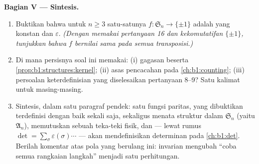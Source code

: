 \begin{problem}
\medskip
\noindent\textbf{Bagian V --- Sintesis.}
\begin{enumerate}[resume]
  \item Buktikan bahwa untuk $n \geq 3$ satu-satunya   $f
        \colon \mathfrak S_n \to \{\pm 1\}$ adalah  yang
        konstan dan $\varepsilon$. \emph{(Dengan memakai pertanyaan 16 dan
        kekomutatifan $\{\pm1\}$, tunjukkan bahwa $f$ bernilai sama
        pada semua transposisi.)}
  \item Di mana persisnya soal ini memakai: (i) gagasan 
        beserta \cref{prop:b1:structures:kernel}; (ii) asas
        pencacahan pada \cref{ch:b1:counting}; (iii) persoalan
        keterdefinisian yang diselesaikan pertanyaan 8--9? Satu
        kalimat untuk masing-masing.
  \item Sintesis, dalam satu paragraf pendek: satu fungsi paritas,
        yang dibuktikan terdefinisi dengan baik sekali saja, sekaligus menata
        struktur dalam $\mathfrak S_n$ (yaitu 
        $\mathfrak A_n$), memutuskan sebuah teka-teki fisik, dan ---
        lewat rumus $\det = \sum_\sigma
        \varepsilon(\sigma)\cdots$ --- akan mendefinisikan determinan
        pada \cref{ch:b1:det}. Berilah komentar atas pola yang berulang ini:
        invarian mengubah ``coba semua rangkaian langkah'' menjadi satu
        perhitungan.

\end{enumerate}
\end{problem}
